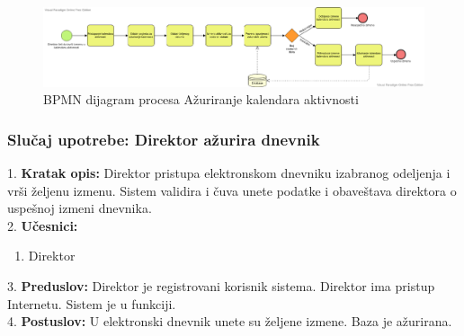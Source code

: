 \documentclass{article}
\begin{document}
\begin{landscape}
\begin{figure} [!ht]
    \begin{center}
        \includegraphics[scale=0.42]{imgs/BPMN_izmena_kalendara.png}
    \end{center}
\caption{BPMN dijagram procesa Ažuriranje kalendara aktivnosti}
\end{figure}
\end{landscape}

\subsubsection{Slučaj upotrebe: Direktor ažurira dnevnik} 
1. \textbf{Kratak opis:} Direktor pristupa elektronskom dnevniku izabranog odeljenja i vrši željenu izmenu. Sistem validira i čuva unete podatke i obaveštava direktora o uspešnoj izmeni dnevnika. \\

2. \textbf{Učesnici:}
\begin{enumerate} [label=(\alph*)]
\item Direktor
\end{enumerate} 

3. \textbf{Preduslov:} Direktor je registrovani korisnik sistema. Direktor ima pristup Internetu. Sistem je u funkciji. \\

4. \textbf{Postuslov:}  U elektronski dnevnik unete su željene izmene. Baza je ažurirana.\\
\end{document}
